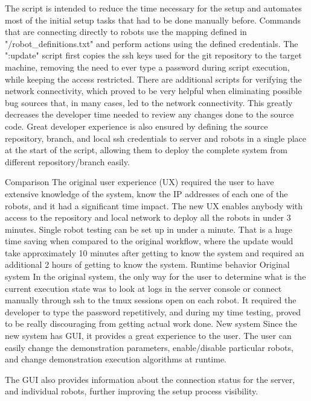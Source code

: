 The script is intended to reduce the time necessary for the setup and automates most of the initial setup tasks that had to be done manually before.
Commands that are connecting directly to robots use the mapping defined in "/robot_definitions.txt" and perform actions using the defined credentials.
The ":update" script first copies the ssh keys used for the git repository to the target machine, removing the need to ever type a password during script execution, while keeping the access restricted.\br
There are additional scripts for verifying the network connectivity, which proved to be very helpful when eliminating possible bug sources that, in many cases, led to the network connectivity. \br
This greatly decreases the developer time needed to review any changes done to the source code. Great developer experience is also ensured by defining the source repository, branch, and local ssh credentials to server and robots in a single place at the start of the script, allowing them to deploy the complete system from different repository/branch easily.

\secc Comparison
The original user experience (UX) required the user to have extensive knowledge of the system, know the IP addresses of each one of the robots, and it had a significant time impact. The new UX enables anybody with access to the repository and local network to deploy all the robots in under 3 minutes. Single robot testing can be set up in under a minute. That is a huge time saving when compared to the original workflow, where the update would take approximately 10 minutes after getting to know the system and required an additional 2 hours of getting to know the system.
\sec Runtime behavior
\secc Original system
In the original system, the only way for the user to determine what is the current execution state was to look at logs in the server console or connect manually through ssh to the tmux sessions open on each robot. It required the developer to type the password repetitively, and during my time testing, proved to be really discouraging from getting actual work done.
\secc New system
Since the new system has GUI, it provides a great experience to the user. The user can easily change the demonstration parameters, enable/disable particular robots, and change demonstration execution algorithms at runtime.

The GUI also provides information about the connection status for the server, and individual robots, further improving the setup process visibility.

